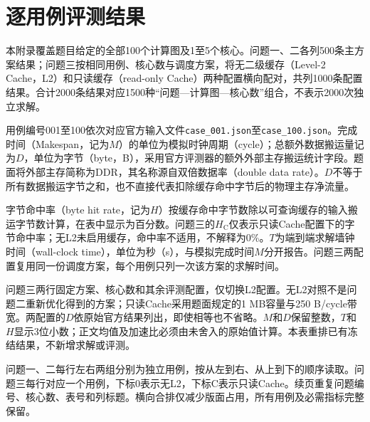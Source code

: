 \section{逐用例评测结果}
本附录覆盖题目给定的全部100个计算图及1至5个核心。问题一、二各列500条主方案结果；问题三按相同用例、核心数与调度方案，将无二级缓存（Level-2 Cache，L2）和只读缓存（read-only Cache）两种配置横向配对，共列1000条配置结果。合计2000条结果对应1500种“问题—计算图—核心数”组合，不表示2000次独立求解。

用例编号001至100依次对应官方输入文件\texttt{case\_001.json}至\texttt{case\_100.json}。完成时间（Makespan，记为$M$）的单位为模拟时钟周期（cycle）；总额外数据搬运量记为$D$，单位为字节（byte，B），采用官方评测器的额外外部主存搬运统计字段。题面将外部主存简称为DDR，其名称源自双倍数据率（double data rate）。$D$不等于所有数据搬运字节之和，也不直接代表扣除缓存命中字节后的物理主存净流量。

字节命中率（byte hit rate，记为$H$）按缓存命中字节数除以可查询缓存的输入搬运字节数计算，在表中显示为百分数。问题三的$H_{\mathrm{C}}$仅表示只读Cache配置下的字节命中率；无L2未启用缓存，命中率不适用，不解释为0\%。$T$为端到端求解墙钟时间（wall-clock time），单位为秒（s），与模拟完成时间$M$分开报告。问题三两配置复用同一份调度方案，每个用例只列一次该方案的求解时间。

问题三两行固定方案、核心数和其余评测配置，仅切换L2配置。无L2对照不是问题二重新优化得到的方案；只读Cache采用题面规定的1 MB容量与250 B/cycle带宽。两配置的$D$依原始官方结果列出，即使相等也不省略。$M$和$D$保留整数，$T$和$H$显示3位小数；正文均值及加速比必须由未舍入的原始值计算。本表重排已有冻结结果，不新增求解或评测。

\noindent 问题一、二每行左右两组分别为独立用例，按从左到右、从上到下的顺序读取。问题三每行对应一个用例，下标0表示无L2，下标C表示只读Cache。续页重复问题编号、核心数、表号和列标题。横向合排仅减少版面占用，所有用例及必需指标完整保留。


